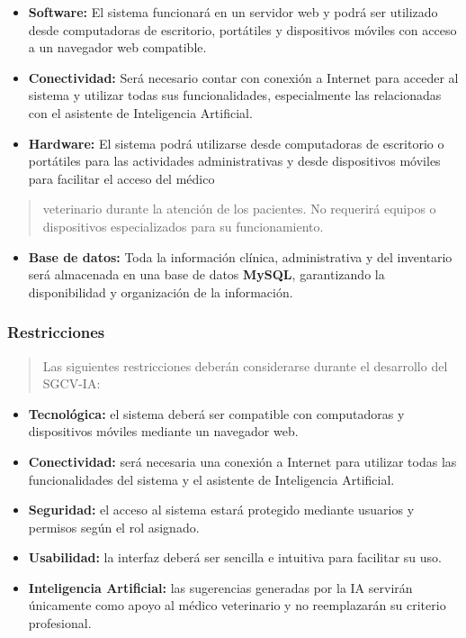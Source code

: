 \documentclass[
]{article}
\begin{document}
\begin{itemize}
\item
  \textbf{Software:} El sistema funcionará en un servidor web y podrá
  ser utilizado desde computadoras de escritorio, portátiles y
  dispositivos móviles con acceso a un navegador web compatible.
\item
  \textbf{Conectividad:} Será necesario contar con conexión a Internet
  para acceder al sistema y utilizar todas sus funcionalidades,
  especialmente las relacionadas con el asistente de Inteligencia
  Artificial.
\item
  \textbf{Hardware:} El sistema podrá utilizarse desde computadoras de
  escritorio o portátiles para las actividades administrativas y desde
  dispositivos móviles para facilitar el acceso del médico
\end{itemize}

\begin{quote}
veterinario durante la atención de los pacientes. No requerirá equipos o
dispositivos especializados para su funcionamiento.
\end{quote}

\begin{itemize}
\item
  \textbf{Base de datos:} Toda la información clínica, administrativa y
  del inventario será almacenada en una base de datos \textbf{MySQL},
  garantizando la disponibilidad y organización de la información.
\end{itemize}

\subsubsection{Restricciones}\label{restricciones}

\begin{quote}
Las siguientes restricciones deberán considerarse durante el desarrollo
del SGCV-IA:
\end{quote}

\begin{itemize}
\item
  \textbf{Tecnológica:} el sistema deberá ser compatible con
  computadoras y dispositivos móviles mediante un navegador web.
\item
  \textbf{Conectividad:} será necesaria una conexión a Internet para
  utilizar todas las funcionalidades del sistema y el asistente de
  Inteligencia Artificial.
\item
  \textbf{Seguridad:} el acceso al sistema estará protegido mediante
  usuarios y permisos según el rol asignado.
\item
  \textbf{Usabilidad:} la interfaz deberá ser sencilla e intuitiva para
  facilitar su uso.
\item
  \textbf{Inteligencia Artificial:} las sugerencias generadas por la IA
  servirán únicamente como apoyo al médico veterinario y no reemplazarán
  su criterio profesional.
\end{itemize}
\end{document}
